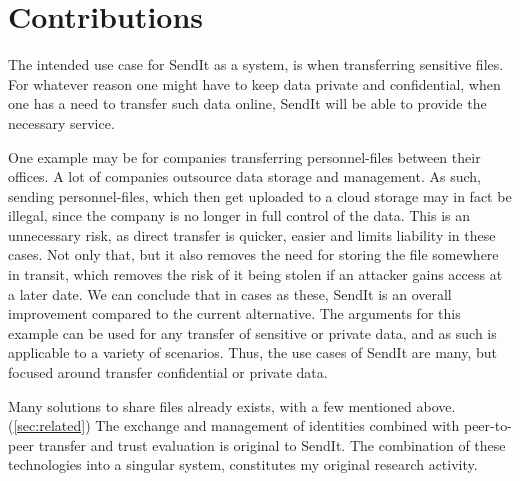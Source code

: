 \section{Contributions}
The intended use case for SendIt as a system, is when transferring sensitive files. For whatever reason one might have to keep data private and confidential, when one has a need to transfer such data online, SendIt will be able to provide the necessary service.

One example may be for companies transferring personnel-files between their offices. A lot of companies outsource data storage and management. As such, sending personnel-files, which then get uploaded to a cloud storage may in fact be illegal, since the company is no longer in full control of the data. This is an unnecessary risk, as direct transfer is quicker, easier and limits liability in these cases. Not only that, but it also removes the need for storing the file somewhere in transit, which removes the risk of it being stolen if an attacker gains access at a later date. We can conclude that in cases as these, SendIt is an overall improvement compared to the current alternative. The arguments for this example can be used for any transfer of sensitive or private data, and as such is applicable to a variety of scenarios. Thus, the use cases of SendIt are many, but focused around transfer confidential or private data.

Many solutions to share files already exists, with a few mentioned above. (\ref{sec:related}) The exchange and management of identities combined with peer-to-peer transfer and trust evaluation is original to SendIt. The combination of these technologies into a singular system, constitutes my original research activity. 

